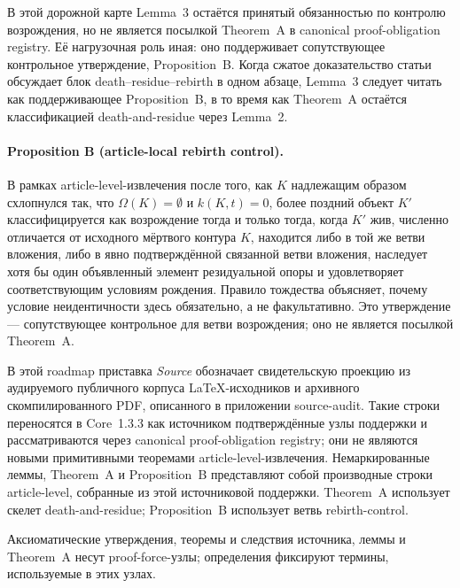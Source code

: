 В этой дорожной карте Lemma~3 остаётся принятый обязанностью по контролю возрождения, но не является посылкой Theorem~A в canonical proof-obligation registry. Её нагрузочная роль иная: оно поддерживает сопутствующее контрольное утверждение, Proposition~B. Когда сжатое доказательство статьи обсуждает блок death--residue--rebirth в одном абзаце, Lemma~3 следует читать как поддерживающее Proposition~B, в то время как Theorem~A остаётся классификацией death-and-residue через Lemma~2.

\paragraph{Proposition B (article-local rebirth control).}
\label{prop:oc13-rebirth-control}
В рамках article-level-извлечения после того, как \(K\) надлежащим образом схлопнулся так, что \(\Omega(K)=\emptyset\) и \(k(K,t)=0\), более поздний объект \(K'\) классифицируется как возрождение тогда и только тогда, когда \(K'\) жив, численно отличается от исходного мёртвого контура \(K\), находится либо в той же ветви вложения, либо в явно подтверждённой связанной ветви вложения, наследует хотя бы один объявленный элемент резидуальной опоры и удовлетворяет соответствующим условиям рождения. Правило тождества объясняет, почему условие неидентичности здесь обязательно, а не факультативно. Это утверждение — сопутствующее контрольное для ветви возрождения; оно не является посылкой Theorem~A.

В этой roadmap приставка \emph{Source} обозначает свидетельскую проекцию из аудируемого публичного корпуса LaTeX-исходников и архивного скомпилированного PDF, описанного в приложении source-audit. Такие строки переносятся в Core~1.3.3 как источником подтверждённые узлы поддержки и рассматриваются через canonical proof-obligation registry; они не являются новыми примитивными теоремами article-level-извлечения. Немаркированные леммы, Theorem~A и Proposition~B представляют собой производные строки article-level, собранные из этой источниковой поддержки. Theorem~A использует скелет death-and-residue; Proposition~B использует ветвь rebirth-control.

Аксиоматические утверждения, теоремы и следствия источника, леммы и Theorem~A несут proof-force-узлы; определения фиксируют термины, используемые в этих узлах.

